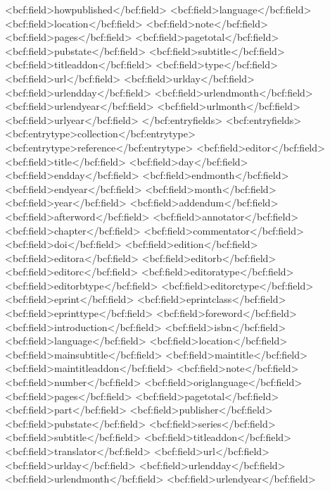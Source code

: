       <bcf:field>howpublished</bcf:field>
      <bcf:field>language</bcf:field>
      <bcf:field>location</bcf:field>
      <bcf:field>note</bcf:field>
      <bcf:field>pages</bcf:field>
      <bcf:field>pagetotal</bcf:field>
      <bcf:field>pubstate</bcf:field>
      <bcf:field>subtitle</bcf:field>
      <bcf:field>titleaddon</bcf:field>
      <bcf:field>type</bcf:field>
      <bcf:field>url</bcf:field>
      <bcf:field>urlday</bcf:field>
      <bcf:field>urlendday</bcf:field>
      <bcf:field>urlendmonth</bcf:field>
      <bcf:field>urlendyear</bcf:field>
      <bcf:field>urlmonth</bcf:field>
      <bcf:field>urlyear</bcf:field>
    </bcf:entryfields>
    <bcf:entryfields>
      <bcf:entrytype>collection</bcf:entrytype>
      <bcf:entrytype>reference</bcf:entrytype>
      <bcf:field>editor</bcf:field>
      <bcf:field>title</bcf:field>
      <bcf:field>day</bcf:field>
      <bcf:field>endday</bcf:field>
      <bcf:field>endmonth</bcf:field>
      <bcf:field>endyear</bcf:field>
      <bcf:field>month</bcf:field>
      <bcf:field>year</bcf:field>
      <bcf:field>addendum</bcf:field>
      <bcf:field>afterword</bcf:field>
      <bcf:field>annotator</bcf:field>
      <bcf:field>chapter</bcf:field>
      <bcf:field>commentator</bcf:field>
      <bcf:field>doi</bcf:field>
      <bcf:field>edition</bcf:field>
      <bcf:field>editora</bcf:field>
      <bcf:field>editorb</bcf:field>
      <bcf:field>editorc</bcf:field>
      <bcf:field>editoratype</bcf:field>
      <bcf:field>editorbtype</bcf:field>
      <bcf:field>editorctype</bcf:field>
      <bcf:field>eprint</bcf:field>
      <bcf:field>eprintclass</bcf:field>
      <bcf:field>eprinttype</bcf:field>
      <bcf:field>foreword</bcf:field>
      <bcf:field>introduction</bcf:field>
      <bcf:field>isbn</bcf:field>
      <bcf:field>language</bcf:field>
      <bcf:field>location</bcf:field>
      <bcf:field>mainsubtitle</bcf:field>
      <bcf:field>maintitle</bcf:field>
      <bcf:field>maintitleaddon</bcf:field>
      <bcf:field>note</bcf:field>
      <bcf:field>number</bcf:field>
      <bcf:field>origlanguage</bcf:field>
      <bcf:field>pages</bcf:field>
      <bcf:field>pagetotal</bcf:field>
      <bcf:field>part</bcf:field>
      <bcf:field>publisher</bcf:field>
      <bcf:field>pubstate</bcf:field>
      <bcf:field>series</bcf:field>
      <bcf:field>subtitle</bcf:field>
      <bcf:field>titleaddon</bcf:field>
      <bcf:field>translator</bcf:field>
      <bcf:field>url</bcf:field>
      <bcf:field>urlday</bcf:field>
      <bcf:field>urlendday</bcf:field>
      <bcf:field>urlendmonth</bcf:field>
      <bcf:field>urlendyear</bcf:field>
